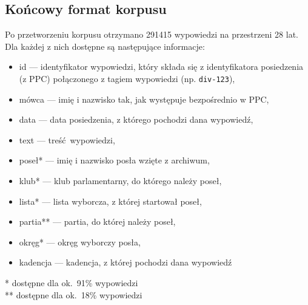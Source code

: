   \subsection{Końcowy format korpusu}
    Po przetworzeniu korpusu otrzymano 291415 wypowiedzi na przestrzeni 28 lat.
    Dla każdej z nich dostępne są następujące informacje:
    \begin{itemize}
      \item id --- identyfikator wypowiedzi, który składa się z identyfikatora posiedzenia (z PPC) połączonego z tagiem wypowiedzi (np. \verb|div-123|),
      \item mówca --- imię i nazwisko tak, jak występuje bezpośrednio w PPC,
      \item data --- data posiedzenia, z którego pochodzi dana wypowiedź,
      \item text --- treść wypowiedzi,
      \item poseł* --- imię i nazwisko posła wzięte z archiwum,
      \item klub* --- klub parlamentarny, do którego należy poseł,
      \item lista* --- lista wyborcza, z której startował poseł,
      \item partia** --- partia, do której należy poseł,
      \item okręg* --- okręg wyborczy posła,
      \item kadencja --- kadencja, z której pochodzi dana wypowiedź
    \end{itemize}
    \vspace{1em}
    * dostępne dla ok.\ 91\% wypowiedzi\\
    ** dostępne dla ok.\ 18\% wypowiedzi
